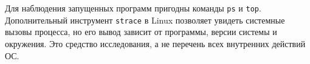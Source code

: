 Для наблюдения запущенных программ пригодны команды \texttt{ps} и \texttt{top}.
Дополнительный инструмент \texttt{strace} в Linux позволяет увидеть системные
вызовы процесса, но его вывод зависит от программы, версии системы и окружения.
Это средство исследования, а не перечень всех внутренних действий ОС.
